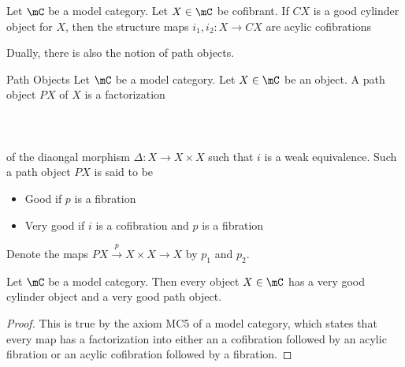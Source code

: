 \documentclass[a4paper]{article}
\begin{document}
\begin{lmm}{}{} Let $\mC$ be a model category. Let $X\in\mC$ be cofibrant. If $CX$ is a good cylinder object for $X$, then the structure maps $i_1,i_2:X\to CX$ are acylic cofibrations
\end{lmm}

Dually, there is also the notion of path objects. 

\begin{defn}{Path Objects}{} Let $\mC$ be a model category. Let $X\in\mC$ be an object. A path object $PX$ of $X$ is a factorization \\~\\
\\~\\
of the diaongal morphism $\Delta:X\to X\times X$ such that $i$ is a weak equivalence. Such a path object $PX$ is said to be 
\begin{itemize}
\item Good if $p$ is a fibration
\item Very good if $i$ is a cofibration and $p$ is a fibration
\end{itemize}
Denote the maps $PX\overset{p}{\longrightarrow}X\times X\to X$ by $p_1$ and $p_2$. 
\end{defn}

\begin{lmm}{}{} Let $\mC$ be a model category. Then every object $X\in\mC$ has a very good cylinder object and a very good path object. \tcbline
\begin{proof}
This is true by the axiom MC5 of a model category, which states that every map has a factorization into either an a cofibration followed by an acylic fibration or an acylic cofibration followed by a fibration. 
\end{proof}
\end{lmm}
\end{document}

